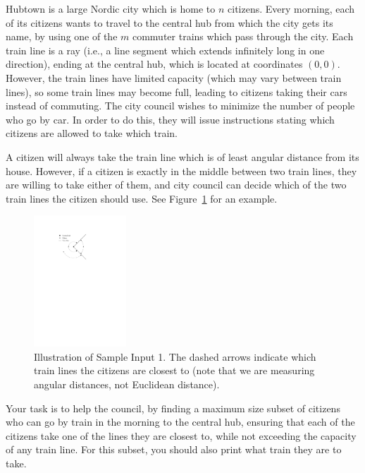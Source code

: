 
\noindent
Hubtown is a large Nordic city which is home to $n$ citizens.
Every morning, each of its citizens wants to travel to the central hub from which the city gets its name, by using one of the $m$ commuter trains which pass through the city.
Each train line is a ray (i.e., a line segment which extends infinitely long in one direction), ending at the central hub, which is located at coordinates $(0, 0)$.
However, the train lines have limited capacity (which may vary between train lines), so some train lines may become full, leading to citizens taking their cars instead of commuting.
The city council wishes to minimize the number of people who go by car.  In order to do this, they will issue instructions stating which citizens are allowed to take which train.

A citizen will always take the train line which is of least angular distance from its house.  However, if a citizen is exactly in the middle between two train lines, they are willing to take either of them, and city council can decide which of the two train lines the citizen should use.  See Figure~\ref{fig:hubtown} for an example.

\begin{figure}[!h]
  \centering
  \includegraphics[width=0.31\textwidth]{sample}
  \caption{Illustration of Sample Input 1.  The dashed arrows indicate which train lines the citizens are closest to (note that we are measuring angular distances, not Euclidean distance).}
  \label{fig:hubtown}
\end{figure}

Your task is to help the council, by finding a maximum size subset of citizens who can go by train in the morning to the central hub, ensuring that each of the citizens take one of the lines they are closest to, while not exceeding the capacity of any train line. For this subset, you should also print what train they are to take.

